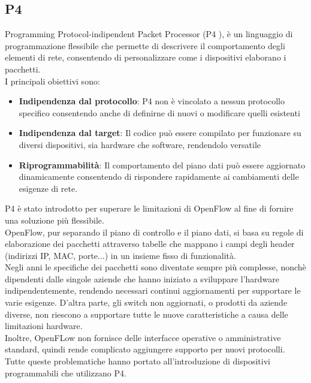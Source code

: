 \subsection{P4}
Programming Protocol-indipendent Packet Processor (P4 \cite{p4}), è un linguaggio di programmazione flessibile
che permette di descrivere il comportamento degli elementi di rete, consentendo di personalizzare come i dispositivi elaborano i pacchetti.
\\I principali obiettivi sono:
\begin{itemize}
    \item \textbf{Indipendenza dal protocollo}: P4 non è vincolato a nessun protocollo specifico consentendo anche di definirne di nuovi o modificare quelli esistenti
    \item \textbf{Indipendenza dal target}: Il codice può essere compilato per funzionare su diversi dispositivi, sia hardware che software, rendendolo versatile
    \item \textbf{Riprogrammabilità}: Il comportamento del piano dati può essere aggiornato dinamicamente consentendo di rispondere rapidamente ai cambiamenti delle esigenze di rete.
\end{itemize}
P4 è stato introdotto per superare le limitazioni di OpenFlow al fine di fornire una soluzione più flessibile.
\\OpenFlow, pur separando il piano di controllo e il piano dati, si basa su regole di elaborazione dei pacchetti attraverso tabelle che mappano i campi degli header (indirizzi IP, MAC, porte...) in un insieme fisso di funzionalità.
\\Negli anni le specifiche dei pacchetti sono diventate sempre più complesse, nonchè dipendenti dalle singole aziende che hanno iniziato a sviluppare l'hardware indipendentemente, rendendo necessari continui aggiornamenti per supportare le varie esigenze\cite{p4art}.
D'altra parte, gli switch non aggiornati, o prodotti da aziende diverse, non riescono a supportare tutte le nuove caratteristiche a causa delle limitazioni hardware.
\\Inoltre, OpenFLow non fornisce delle interfacce operative o amministrative standard, quindi rende complicato aggiungere supporto per nuovi protocolli.
Tutte queste problematiche hanno portato all'introduzione di dispositivi programmabili che utilizzano P4.
